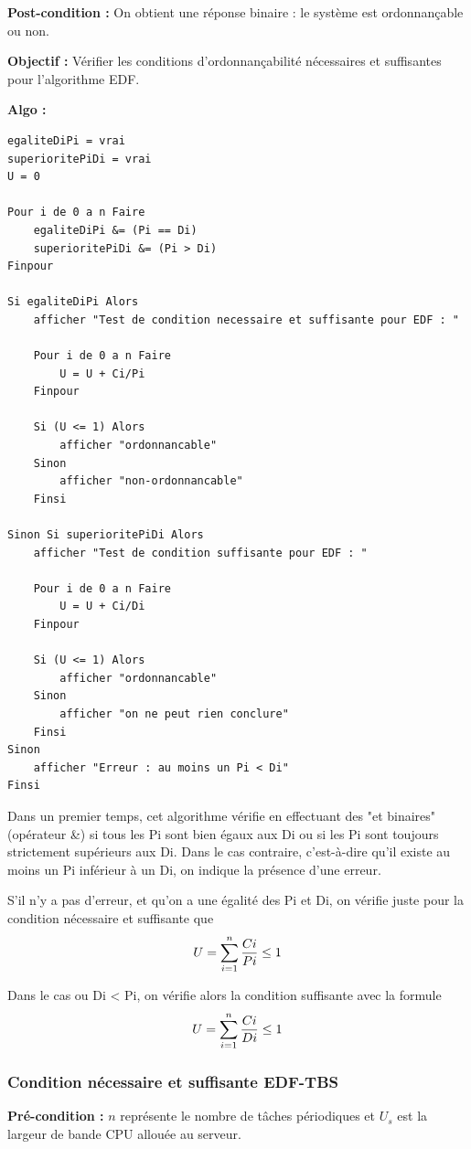 				\textbf{Post-condition :} On obtient une réponse binaire : le système est ordonnançable ou non.
				
				\textbf{Objectif :} Vérifier les conditions d'ordonnançabilité nécessaires et suffisantes pour l'algorithme EDF.
				
				\textbf{Algo :} 
					\begin{lstlisting}[mathescape]
egaliteDiPi = vrai					
superioritePiDi = vrai
U = 0		
			
Pour i de 0 a n Faire
	egaliteDiPi &= (Pi == Di) 
	superioritePiDi &= (Pi > Di) 
Finpour

Si egaliteDiPi Alors
	afficher "Test de condition necessaire et suffisante pour EDF : "

    Pour i de 0 a n Faire
	    U = U + Ci/Pi
    Finpour
	
	Si (U <= 1) Alors
		afficher "ordonnancable"
	Sinon
		afficher "non-ordonnancable"
	Finsi
	
Sinon Si superioritePiDi Alors
	afficher "Test de condition suffisante pour EDF : "
    
    Pour i de 0 a n Faire
	    U = U + Ci/Di
    Finpour
	
	Si (U <= 1) Alors
		afficher "ordonnancable"
	Sinon
		afficher "on ne peut rien conclure"
	Finsi
Sinon
    afficher "Erreur : au moins un Pi < Di"
Finsi
					\end{lstlisting}
					
					Dans un premier temps, cet algorithme vérifie en effectuant des "et binaires" (opérateur \&) si tous les Pi sont bien égaux aux Di ou si les Pi sont toujours strictement supérieurs aux Di. Dans le cas contraire, c'est-à-dire qu'il existe au moins un Pi inférieur à un Di, on indique la présence d'une erreur.
					
					S'il n'y a pas d'erreur, et qu'on a une égalité des Pi et Di, on vérifie juste pour la condition nécessaire et suffisante que \[ U = \sum_{i=1}^{n} {Ci \over Pi}  \le 1 \]
 
 					Dans le cas ou Di < Pi, on vérifie alors la condition suffisante avec la formule \[ U = \sum_{i=1}^{n} {Ci \over Di}  \le 1 \]
					
					
			\subsubsection{Condition nécessaire et suffisante EDF-TBS}
				\textbf{Pré-condition :} $n$ représente le nombre de tâches périodiques et $U_s$ est la largeur de bande CPU allouée au serveur.
				

